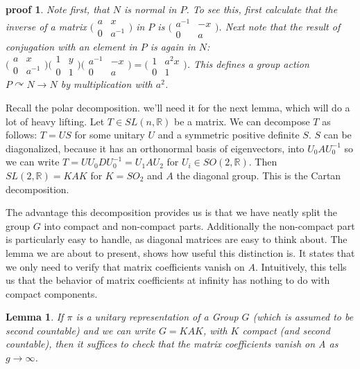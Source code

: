 \documentclass[
  12pt
]{article}
\theoremstyle{break}
\theoremstyle{plain}
\newtheorem{lem}[thm]{Lemma}
\newtheorem*{pf}{proof}
\newcommand{\slnr}{\ensuremath{SL(n, \mathbb{R})}\xspace}
\newcommand{\ipmatrix}[1]{%
\ensuremath{\big(\begin{smallmatrix} #1 \end{smallmatrix}\big)}\xspace}
\begin{document}
\begin{pf}
    Note first, that $N$ is normal in $P$. To see this, first calculate that the
    inverse of a matrix $\ipmatrix{ a & x \\ 0 & a^{-1} }$ in $P$ is $\ipmatrix{
    a^{-1} & -x \\ 0 & a }$. Next note that the result of conjugation with an
    element in $P$ is again in $N$: $\ipmatrix{ a & x \\ 0 & a^{-1} } \ipmatrix{1 &
    y \\ 0 & 1} \ipmatrix{ a^{-1} & -x \\ 0 & a } = \ipmatrix{1 & a^2x \\ 0 & 1}$.
    This defines a group action $P \curvearrowright N \rightarrow N$ by
    multiplication with $a^2$.
  \end{pf}


  Recall the polar decomposition. we'll need it for the next lemma, which will do a lot of heavy lifting.
  Let $T \in \slnr$ be a matrix. We can decompose $T$ as follows:
  $T = US$ for some unitary $U$ and a symmetric positive definite $S$. $S$ can be
  diagonalized, because it has an orthonormal basis of eigenvectors, into $U_0 A U_0^{-1}$ so we can write
  $T = U U_0 D U_0^{-1} = U_1 A U_2$ for $U_i \in SO(2, \mathbb{R})$.
  Then $SL(2, \mathbb{R}) = KAK$ for $K = SO_2$ and $A$ the diagonal
  group. This is the Cartan decomposition.

  The advantage this decomposition provides us is that we have neatly split the group $G$ into compact and non-compact parts.
  Additionally the non-compact part is particularly easy to handle, as diagonal matrices are easy to think about.
  The lemma we are about to present, shows how useful this distinction is. It states that we only need to verify that matrix coefficients vanish on $A$.
  Intuitively, this tells us that the behavior of matrix coefficients at infinity has nothing to do with compact components.


  \begin{lem}
    \label{lemma}
    If $\pi$ is a unitary representation of a Group $G$ (which is assumed to be second countable) and we can write $G =
    KAK$, with $K$ compact (and second countable), then it suffices to check that the matrix
    coefficients vanish on A as $g \rightarrow \infty$.
  \end{lem}
\end{document}
